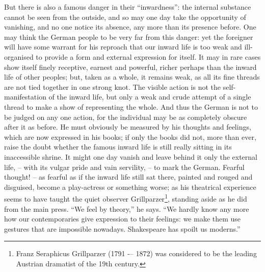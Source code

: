 But there is also a famous danger in their \enquote{inwardness}: the internal
substance cannot be seen from the outside, and so may one day take
the opportunity of vanishing, and no one notice its absence, any more
than its presence before. One may think the German people to be very
far from this danger: yet the foreigner will have some warrant for
his reproach that our inward life is too weak and ill-organised to
provide a form and external expression for itself. It may in rare
cases show itself finely receptive, earnest and powerful, richer
perhaps than the inward life of other peoples; but, taken as a whole,
it remains weak, as all its fine threads are not tied together in one
strong knot. The visible action is not the self-manifestation of the
inward life, but only a weak and crude attempt of a single thread to
make a show of representing the whole. And thus the German is not to
be judged on any one action, for the individual may be as completely
obscure after it as before. He must obviously be measured by his
thoughts and feelings, which are now expressed in his books; if only
the books did not, more than ever, raise the doubt whether the famous
inward life is still really sitting in its inaccessible shrine. It
might one day vanish and leave behind it only the external
life, -- with its vulgar pride and vain servility, -- to mark the German.
Fearful thought! -- as fearful as if the inward life still sat there,
painted and rouged and disguised, become a play-actress or something
worse; as his theatrical experience seems to have taught the quiet
observer Grillparzer\footnote{Franz Seraphicus Grillparzer (1791 -– 1872) was considered to be the leading Austrian dramatist of the 19th century.}, standing aside as he did from the main press.
\enquote{We feel by theory,} he says. \enquote{We hardly know any more how our
contemporaries give expression to their feelings: we make them use
gestures that are impossible nowadays. Shakespeare has spoilt us
moderns.}

